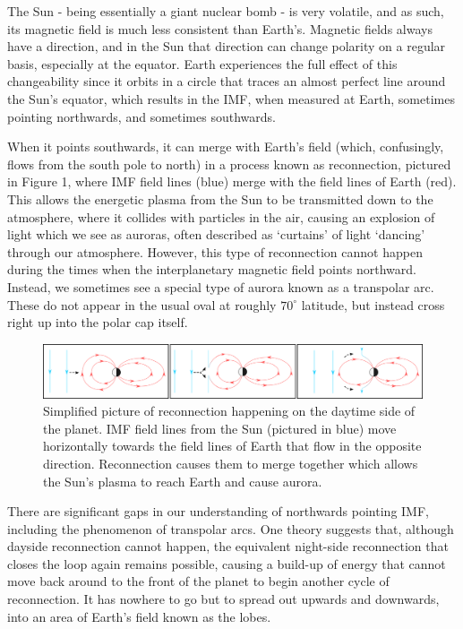 \documentclass[12pt]{article}
\begin{document}
The Sun - being essentially a giant nuclear bomb - is very volatile, and as such, its magnetic field is much less consistent than Earth’s. Magnetic fields always have a direction, and in the Sun that direction can change polarity on a regular basis, especially at the equator. Earth experiences the full effect of this changeability since it orbits in a circle that traces an almost perfect line around the Sun’s equator, which results  in the IMF, when measured at Earth, sometimes pointing northwards, and sometimes southwards. 

When it points southwards, it can merge with Earth’s field (which, confusingly, flows from the south pole to north) in a process known as reconnection, pictured in Figure 1, where IMF field lines (blue) merge with the field lines of Earth (red). This allows the energetic plasma from the Sun to be transmitted down to the atmosphere, where it collides with particles in the air, causing an explosion of light which we see as auroras, often described as ‘curtains’ of  light ‘dancing’ through our atmosphere. However, this type of reconnection cannot happen during the times when the interplanetary magnetic field points northward. Instead, we sometimes see a special type of aurora known as a transpolar arc. These do not  appear in the usual oval at roughly $70^\circ$ latitude, but instead cross right up into the polar cap itself. 

\begin{figure}
    \centering
    \includegraphics[width=\textwidth]{DungeyCycle.png}
    \caption{Simplified picture of reconnection happening on the daytime side of the planet. IMF field lines from the Sun (pictured in blue) move horizontally towards the field lines of Earth that flow in the opposite direction. Reconnection causes them to merge together which allows the Sun’s plasma to reach Earth and cause aurora. }
    \label{fig:dungey}
\end{figure}

There are significant gaps in our understanding of  northwards pointing IMF,  including the phenomenon of transpolar arcs. One theory \cite{TPAdebate} suggests that, although dayside reconnection cannot happen, the equivalent night-side reconnection that closes the loop again remains possible, causing   a build-up of energy that cannot move back around to the front of the planet to begin another cycle of reconnection. It has nowhere to go but to spread out upwards and downwards, into an area of Earth’s field known as the lobes. 
\end{document}
